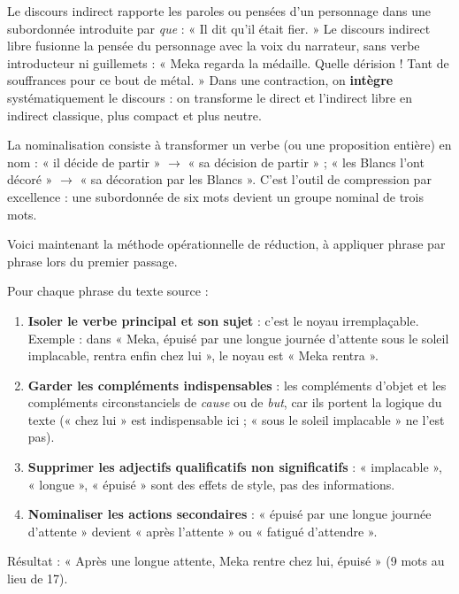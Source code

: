 \documentclass[11pt]{article}
\newcommand{\cle}[1]{{\popxbold\color{popdark}#1}}
\newcounter{popsec}
\newcounter{popsub}
\newcommand{\courssub}[1]{%
  \stepcounter{popsub}%
  \par\vspace{9pt}\noindent{\popxbold\fontsize{11.5}{13}\selectfont\color{popink}{\color{poporange}\thepopsec.\thepopsub}\hspace{6pt}#1}\par\nopagebreak\vspace{4pt}
}
\begin{document}
\begin{definition}
Le \cle{discours indirect} rapporte les paroles ou pensées d'un personnage dans une subordonnée introduite par \emph{que} : « Il dit qu'il était fier. » Le \cle{discours indirect libre} fusionne la pensée du personnage avec la voix du narrateur, sans verbe introducteur ni guillemets : « Meka regarda la médaille. Quelle dérision ! Tant de souffrances pour ce bout de métal. » Dans une contraction, on \textbf{intègre} systématiquement le discours : on transforme le direct et l'indirect libre en indirect classique, plus compact et plus neutre.
\end{definition}

\begin{definition}[Nominalisation]
La \cle{nominalisation} consiste à transformer un verbe (ou une proposition entière) en nom : « il décide de partir » $\rightarrow$ « sa décision de partir » ; « les Blancs l'ont décoré » $\rightarrow$ « sa décoration par les Blancs ». C'est l'outil de compression par excellence : une subordonnée de six mots devient un groupe nominal de trois mots.
\end{definition}

\courssub{La technique du « Noyau dur »}

Voici maintenant la méthode opérationnelle de réduction, à appliquer phrase par phrase lors du premier passage.

\begin{methode}
Pour chaque phrase du texte source :
\begin{enumerate}
\item \textbf{Isoler le verbe principal et son sujet} : c'est le noyau irremplaçable. Exemple : dans « Meka, épuisé par une longue journée d'attente sous le soleil implacable, rentra enfin chez lui », le noyau est « Meka rentra ».
\item \textbf{Garder les compléments indispensables} : les compléments d'objet et les compléments circonstanciels de \emph{cause} ou de \emph{but}, car ils portent la logique du texte (« chez lui » est indispensable ici ; « sous le soleil implacable » ne l'est pas).
\item \textbf{Supprimer les adjectifs qualificatifs non significatifs} : « implacable », « longue », « épuisé » sont des effets de style, pas des informations.
\item \textbf{Nominaliser les actions secondaires} : « épuisé par une longue journée d'attente » devient « après l'attente » ou « fatigué d'attendre ».
\end{enumerate}
Résultat : « Après une longue attente, Meka rentre chez lui, épuisé » (9 mots au lieu de 17).
\end{methode}
\end{document}
